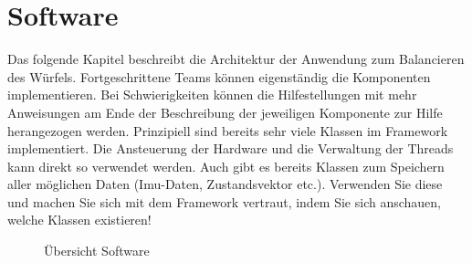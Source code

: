 \chapter{Software}
    \label{ch:Software}
    Das folgende Kapitel beschreibt die Architektur der Anwendung zum Balancieren des Würfels. Fortgeschrittene Teams können eigenständig die Komponenten implementieren. Bei Schwierigkeiten können die Hilfestellungen mit mehr Anweisungen am Ende der Beschreibung der jeweiligen Komponente zur Hilfe herangezogen werden. Prinzipiell sind bereits sehr viele Klassen im Framework implementiert. Die Ansteuerung der Hardware und die Verwaltung der Threads kann direkt so verwendet werden. Auch gibt es bereits Klassen zum Speichern aller möglichen Daten (Imu-Daten, Zustandsvektor etc.). Verwenden Sie diese und machen Sie sich mit dem Framework vertraut, indem Sie sich anschauen, welche Klassen existieren!

    \begin{figure}[H]
        \centering
            \def\svgwidth{\linewidth} 
            
        \caption{Übersicht Software}
        \label{fig:AnwendungSoftware}
    \end{figure}
    
